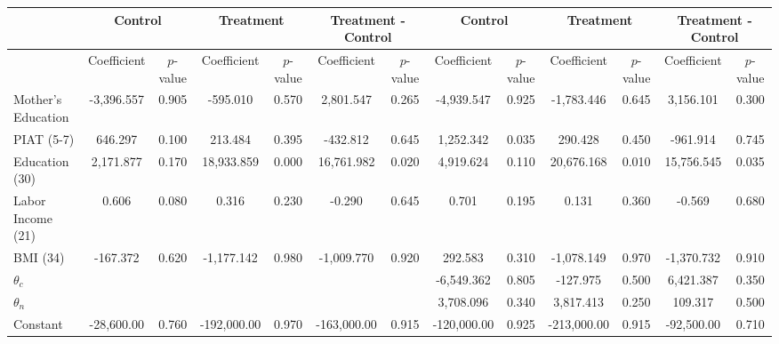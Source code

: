 \begin{tabular}{lcccccccccccc} \toprule
&\multicolumn{2}{c}{Control} & \multicolumn{2}{c}{Treatment} & \multicolumn{2}{c}{Treatment - Control} & \multicolumn{2}{c}{Control} & \multicolumn{2}{c}{Treatment} & \multicolumn{2}{c}{Treatment - Control} \\ \midrule
 & Coefficient  & $p$-value  & Coefficient  & $p$-value & Coefficient  & $p$-value  & Coefficient  & $p$-value  & Coefficient  & $p$-value  & Coefficient  & $p$-value \\ \midrule
Mother's Education & -3,396.557 &     0.905 &  -595.010 &     0.570 &  2,801.547 &     0.265 & -4,939.547 &     0.925 & -1,783.446 &     0.645 &  3,156.101 &     0.300 \\  
PIAT (5-7)&   646.297 &     0.100 &   213.484 &     0.395 &  -432.812 &     0.645 &  1,252.342 &     0.035 &   290.428 &     0.450 &  -961.914 &     0.745 \\  
Education (30) &  2,171.877 &     0.170 & 18,933.859 &     0.000 & 16,761.982 &     0.020 &  4,919.624 &     0.110 & 20,676.168 &     0.010 & 15,756.545 &     0.035 \\  
Labor Income (21) &     0.606 &     0.080 &     0.316 &     0.230 &    -0.290 &     0.645 &     0.701 &     0.195 &     0.131 &     0.360 &    -0.569 &     0.680 \\  
BMI (34)  &  -167.372 &     0.620 & -1,177.142 &     0.980 & -1,009.770 &     0.920 &   292.583 &     0.310 & -1,078.149 &     0.970 & -1,370.732 &     0.910 \\  
$\theta_{c}$ &         &        &        &        &        &        &-6,549.362 &     0.805 &  -127.975 &     0.500 &  6,421.387 &     0.350 \\  
$\theta_{n}$ &         &        &        &        &        &        & 3,708.096 &     0.340 &  3,817.413 &     0.250 &   109.317 &     0.500 \\  
Constant & -28,600.00 &     0.760 & -192,000.00 &     0.970 & -163,000.00 &     0.915 & -120,000.00 &     0.925 & -213,000.00 &     0.915 & -92,500.00 &     0.710 \\  
\bottomrule \end{tabular}
